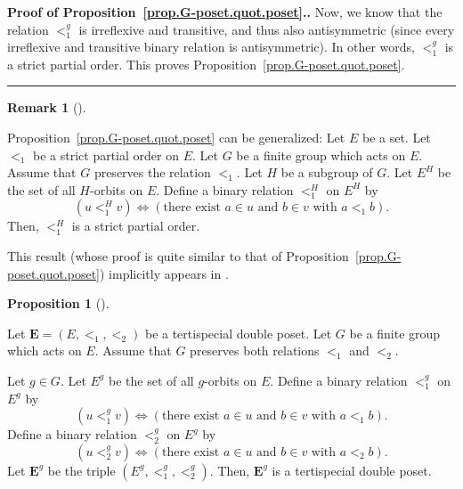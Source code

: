 \documentclass[numbers=enddot,12pt,final,onecolumn,notitlepage,abstracton]{scrartcl}%
\theoremstyle{definition}
\newtheorem{prop}[theo]{Proposition}
\newenvironment{proposition}[1][]
{\begin{prop}[#1]\begin{leftbar}}
{\end{leftbar}\end{prop}}
\newtheorem{remk}[theo]{Remark}
\newenvironment{remark}[1][]
{\begin{remk}[#1]\begin{leftbar}}
{\end{leftbar}\end{remk}}
\newenvironment{proof}[1][Proof]{\noindent\textbf{#1.} }{\ \rule{0.5em}{0.5em}}
\newcommand{\EE}{{\mathbf{E}}}
\begin{document}
\begin{proof}[Proof of Proposition~\ref{prop.G-poset.quot.poset}.]
Now, we know that the relation $<_{1}^{g}$ is irreflexive and transitive, and
thus also antisymmetric (since every irreflexive and transitive binary
relation is antisymmetric). In other words, $<_{1}^{g}$ is a strict partial
order. This proves Proposition~\ref{prop.G-poset.quot.poset}.
\end{proof}

\begin{remark}
Proposition~\ref{prop.G-poset.quot.poset} can be generalized:
Let $E$ be a set. Let $<_1$ be a strict partial order on $E$.
Let $G$ be a finite group which acts on $E$. Assume that $G$ preserves
the relation $<_1$. Let $H$ be a subgroup of $G$.
Let $E^H$ be the set of all $H$-orbits on $E$.
Define a binary relation $<_{1}^H$ on $E^H$ by
\[
\left(  u<_{1}^H v\right)  \Longleftrightarrow\left(  \text{there exist }a\in
u\text{ and }b\in v\text{ with }a<_{1}b\right)  .
\]
Then, $<_1^H$ is a strict partial order.

This result (whose proof is quite similar to that of
Proposition~\ref{prop.G-poset.quot.poset}) implicitly appears in
\cite[p. 30]{Stanley-Peck}.
\end{remark}

\begin{proposition}
\label{prop.G-poset.quot.double}
Let $\EE = \left(E, <_1, <_2\right)$ be a tertispecial double poset.
Let $G$ be a finite group which acts on $E$. Assume that $G$ preserves
both relations $<_1$ and $<_2$.

Let $g \in G$. Let $E^g$ be the set of all $g$-orbits
on $E$. Define a binary relation $<_{1}^{g}$ on $E^{g}$ by
\[
\left(  u<_{1}^{g}v\right)  \Longleftrightarrow\left(  \text{there exist }a\in
u\text{ and }b\in v\text{ with }a<_{1}b\right)  .
\]
Define a binary relation $<_{2}^{g}$ on $E^{g}$ by
\[
\left(  u<_{2}^{g}v\right)  \Longleftrightarrow\left(  \text{there exist }a\in
u\text{ and }b\in v\text{ with }a<_{2}b\right)  .
\]
Let $\EE^g$ be the triple $\left(E^g, <_1^g, <_2^g\right)$. Then,
$\EE^g$ is a tertispecial double poset.
\end{proposition}
\end{document}

